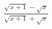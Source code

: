 \hspace*{2mm}\begin{minipage}[t]{\dimexpr\linewidth-2mm\relax}\vspace{0pt}
$\dfrac{\sqrt{x+1}-\sqrt{x}}{\sqrt{x+1}+\sqrt{x}}$\end{minipage}

